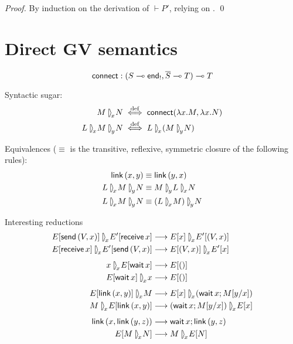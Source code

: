\documentclass[orivec,envcountsame]{llncs}
\begin{document}
\begin{proof}
  By induction on the derivation of $\vdash P'$, relying on .  \qed
\end{proof}

\section{Direct GV semantics}

\newcommand{\rpar}[1]{\mathbin{{[}\:\!\!\rangle}_{\!{#1}}\!}
\newcommand{\lrpar}[1]{\mathbin{\langle\hspace{-.3ex}\rangle}_{\!{#1}}\!}
\newcommand{\lpar}[1]{\mathbin{\langle\:\!\!{]}}_{{#1}}\!}

\newcommand{\con}[3]{{#1} \rpar{#2} {#3}}

\[
\mathsf{connect} : (S \multimap \mathsf{end}_!, \overline{S} \multimap T) \multimap T
\]

Syntactic sugar:
\begin{align*}
\con{M}{x}{N} &\defiff \gvconst{connect}(\lambda x.M, \lambda x.N) \\
\con{L}{x}{\con{M}{y}{N}} &\defiff \con{L}{x}{(\con{M}{y}{N})} \\
\end{align*}

Equivalences ($\equiv$ is the transitive, reflexive, symmetric closure of the following rules):
\begin{align*}
\gvconst{link}\,(x,y) &\equiv \gvconst{link}\,(y,x) \\
\con{L}{x}{\con{M}{y}{N}} &\equiv \con{M}{y}{\con{L}{x}{N}} \\
\con{L}{x}{\con{M}{y}{N}} &\equiv \con{(\con{L}{x}{M})}{y}{N} \\
\end{align*}

Interesting reductions
\begin{align*}
\con{E[\gvconst{send}\,(V,x)]}{x}{E'[\gvconst{receive}\,x]}
  &\rto \con{E[x]}{x}{E'[(V,x)]} \\
\con{E[\gvconst{receive}\,x]}{x}{E'[\gvconst{send}\,(V,x)]}
  &\rto \con{E[(V,x)]}{x}{E'[x]} \\[1ex]
\con{x}{x}{E[\gvconst{wait}\,x]}
  &\rto E[()] \\
\con{E[\gvconst{wait}\,x]}{x}{x}
  &\rto E[()] \\[1ex]
\con{E[\gvconst{link}\,(x,y)]}{x}{M}
  &\rto \con{E[x]}{x}{(\gvconst{wait}\,x; M[y/x])} \\
\con{M}{x}{E[\gvconst{link}\,(x,y)]}
  &\rto \con{(\gvconst{wait}\,x; M[y/x])}{x}{E[x]} \\[1ex]
\gvconst{link}\,(x,\gvconst{link}\,(y,z))
  &\rto \gvconst{wait}\,x; \gvconst{link}\,(y,z) \\
E[\con{M}{x}{N}]
  &\rto \con{M}{x}{E[N]} \\
\end{align*}
\end{document}
